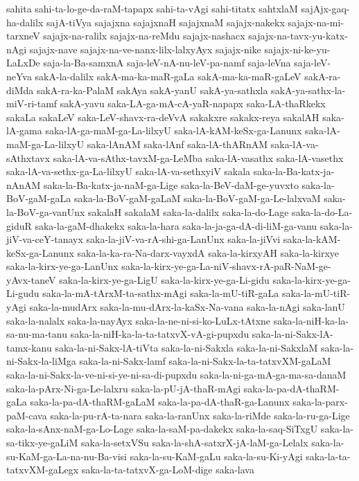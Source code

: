 {sahita
sahi-ta-lo-ge-da-raM-tapapx
sahi-ta-vAgi
sahi-titatx
sahtxlaM
sajAjx-gaq-ha-dalilx
sajA-tiVya
sajajxna
sajajxnaH
sajajxnaM
sajajx-nakekx
sajajx-na-mi-tarxneV
sajajx-na-ralilx
sajajx-na-reMdu
sajajx-nashacx
sajajx-na-tavx-yu-katx-nAgi
sajajx-nave
sajajx-na-ve-nanx-lilx-lalxyAyx
sajajx-nike
sajajx-ni-ke-yu-LaLxDe
saja-la-Ba-samxnA
saja-leV-nA-nu-leV-pa-namf
saja-leVna
saja-leV-neYva
sakA-la-dalilx
sakA-ma-ka-maR-gaLa
sakA-ma-ka-maR-gaLeV
sakA-ra-diMda
sakA-ra-ka-PalaM
sakAya
sakA-yanU
sakA-ya-sathxla
sakA-ya-sathx-la-miV-ri-tamf
sakA-yavu
saka-LA-ga-mA-cA-yaR-napapx
saka-LA-thaRkekx
sakaLa
sakaLeV
saka-LeV-shavx-ra-deVvA
sakakxre
sakakx-reya
sakalAH
saka-lA-gama
saka-lA-ga-maM-ga-La-lilxyU
saka-lA-kAM-keSx-ga-Lanunx
saka-lA-maM-ga-La-lilxyU
saka-lAnAM
saka-lAnf
saka-lA-thARnAM
saka-lA-va-sAthxtavx
saka-lA-va-sAthx-tavxM-ga-LeMba
saka-lA-vasathx
saka-lA-vasethx
saka-lA-va-sethx-ga-La-lilxyU
saka-lA-va-sethxyiV
sakala
saka-la-Ba-katx-ja-nAnAM
saka-la-Ba-katx-ja-naM-ga-Lige
saka-la-BeV-daM-ge-yuvxto
saka-la-BoV-gaM-gaLa
saka-la-BoV-gaM-gaLaM
saka-la-BoV-gaM-ga-Le-lalxvaM
saka-la-BoV-ga-vanUnx
sakalaH
sakalaM
saka-la-dalilx
saka-la-do-Lage
saka-la-do-La-giduR
saka-la-gaM-dhakekx
saka-la-hara
saka-la-ja-ga-dA-di-liM-ga-vanu
saka-la-jiV-va-ceY-tanayx
saka-la-jiV-va-rA-shi-ga-LanUnx
saka-la-jiVvi
saka-la-kAM-keSx-ga-Lanunx
saka-la-ka-ra-Na-darx-vayxdA
saka-la-kirxyAH
saka-la-kirxye
saka-la-kirx-ye-ga-LanUnx
saka-la-kirx-ye-ga-La-niV-shavx-rA-paR-NaM-ge-yAvx-taneV
saka-la-kirx-ye-ga-LigU
saka-la-kirx-ye-ga-Li-gidu
saka-la-kirx-ye-ga-Li-gudu
saka-la-mA-tArxM-ta-sathx-mAgi
saka-la-mU-tiR-gaLa
saka-la-mU-tiR-yAgi
saka-la-mudArx
saka-la-mu-dArx-la-kaSx-Na-vana
saka-la-nAgi
saka-lanU
saka-la-nalalx
saka-la-nayAyx
saka-la-ne-ni-si-ko-LuLx-tAtxne
saka-la-niH-ka-la-sa-nu-ma-tanu
saka-la-niH-ka-la-ta-tatxvX-vA-gi-pupxdu
saka-la-ni-Sakx-lA-tamx-kanu
saka-la-ni-Sakx-lA-tiVta
saka-la-ni-Sakxla
saka-la-ni-SakxlaM
saka-la-ni-Sakx-la-liMga
saka-la-ni-Sakx-lamf
saka-la-ni-Sakx-la-ta-tatxvXM-gaLaM
saka-la-ni-Sakx-la-ve-ni-si-ye-ni-sa-di-pupxdu
saka-la-ni-ga-mA-ga-ma-sa-danaM
saka-la-pArx-Ni-ga-Le-lalxru
saka-la-pU-jA-thaR-mAgi
saka-la-pa-dA-thaRM-gaLa
saka-la-pa-dA-thaRM-gaLaM
saka-la-pa-dA-thaR-ga-Lanunx
saka-la-parx-paM-cava
saka-la-pu-rA-ta-nara
saka-la-ranUnx
saka-la-riMde
saka-la-ru-ga-Lige
saka-la-sAnx-naM-ga-Lo-Lage
saka-la-saM-pa-dakekx
saka-la-saq-SiTxgU
saka-la-sa-tikx-ye-gaLiM
saka-la-setxVSu
saka-la-shA-satxrX-jA-laM-ga-Lelalx
saka-la-su-KaM-ga-La-na-nu-Ba-visi
saka-la-su-KaM-gaLu
saka-la-su-Ki-yAgi
saka-la-ta-tatxvXM-gaLegx
saka-la-ta-tatxvX-ga-LoM-dige
saka-lava
}
